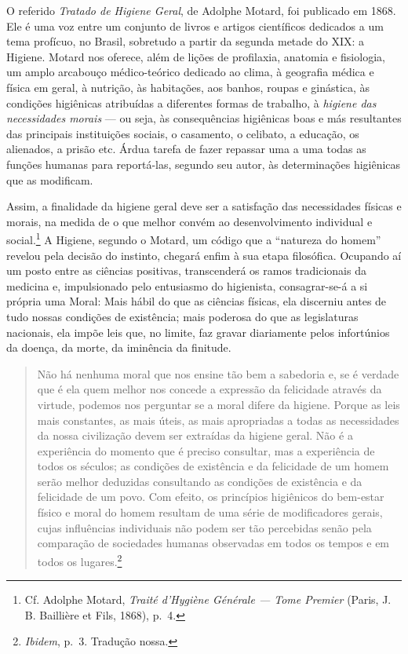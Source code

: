 O referido \textit{Tratado de Higiene Geral}, de Adolphe Motard, foi
publicado em 1868. Ele é uma voz entre um conjunto de livros e artigos
científicos dedicados a um tema profícuo, no Brasil, sobretudo a partir
da segunda metade do XIX: a Higiene. Motard nos oferece, além de lições
de profilaxia, anatomia e fisiologia, um amplo arcabouço médico-teórico
dedicado ao clima, à geografia médica e física em geral, à nutrição, às
habitações, aos banhos, roupas e ginástica, às condições higiênicas
atribuídas a diferentes formas de trabalho, à \textit{higiene das
necessidades morais} --- ou seja, às consequências higiênicas boas e más
resultantes das principais instituições sociais, o casamento, o
celibato, a educação, os alienados, a prisão etc. Árdua tarefa de fazer
repassar uma a uma todas as funções humanas para reportá-las, segundo
seu autor, às determinações higiênicas que as modificam.

Assim, a finalidade da higiene geral deve ser a satisfação das
necessidades físicas e morais, na medida de o que melhor convém ao
desenvolvimento individual e social.\footnote{Cf. Adolphe Motard,
  \textit{Traité d'Hygiène Générale --- Tome Premier} (Paris, J. B.
  Baillière et Fils, 1868), p.~4.} A Higiene, segundo o Motard, um
código que a ``natureza do homem'' revelou pela decisão do instinto,
chegará enfim à sua etapa filosófica. Ocupando aí um posto entre as
ciências positivas, transcenderá os ramos tradicionais da medicina e,
impulsionado pelo entusiasmo do higienista, consagrar-se-á a si própria
uma Moral: Mais hábil do que as ciências físicas, ela discerniu antes de
tudo nossas condições de existência; mais poderosa do que as
legislaturas nacionais, ela impõe leis que, no limite, faz gravar
diariamente pelos infortúnios da doença, da morte, da iminência da
finitude.

\begin{quote}
Não há nenhuma moral que nos ensine tão bem a sabedoria e, se é verdade
que é ela quem melhor nos concede a expressão da felicidade através da
virtude, podemos nos perguntar se a moral difere da higiene. Porque as
leis mais constantes, as mais úteis, as mais apropriadas a todas as
necessidades da nossa civilização devem ser extraídas da higiene geral.
Não é a experiência do momento que é preciso consultar, mas a
experiência de todos os séculos; as condições de existência e da
felicidade de um homem serão melhor deduzidas consultando as condições
de existência e da felicidade de um povo. Com efeito, os princípios
higiênicos do bem-estar físico e moral do homem resultam de uma série de
modificadores gerais, cujas influências individuais não podem ser tão
percebidas senão pela comparação de sociedades humanas observadas em
todos os tempos e em todos os lugares.\footnote{\textit{Ibidem}, p.~3.
  Tradução nossa.}
\end{quote}

